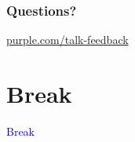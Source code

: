 \documentclass[t]{beamer}
\newcommand\blue[1]{\textcolor{blue}{#1}}
\newcommand\talksection[1]{\section{#1}
\begin{frame}
  \vfill\Huge\bf\blue{\centerline{#1}}
\end{frame}
}
\begin{document}
\begin{frame}
  \frametitle{}

  \note{

  }

\end{frame}

\begin{frame}
  \frametitle{}

  \note{

  }

\end{frame}

\begin{frame}
  \frametitle{}

  \note{

  }

\end{frame}

\begin{frame}
  \frametitle{}

  \note{

  }

\end{frame}

\begin{frame}
  \frametitle{}

  \note{

  }

\end{frame}

\begin{frame}
  \frametitle{}

  \note{

  }

\end{frame}

\begin{frame}
  \frametitle{}

  \note{

  }

\end{frame}

\begin{frame}
  \frametitle{}

  \note{

  }

\end{frame}

\begin{frame}
  \frametitle{}

  \note{

  }

\end{frame}

\begin{frame}
  \frametitle{Questions?}
  \vspace{3cm}
  \centerline{\large\url{purple.com/talk-feedback}}
\end{frame}

\talksection{Break}
\end{document}
